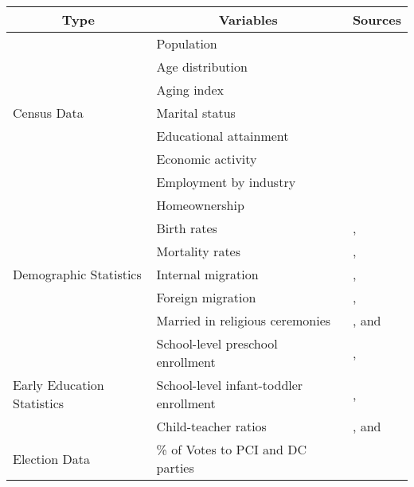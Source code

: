 \begin{tabular}{lll}
\toprule
\multicolumn{1}{c}{Type}	&	\multicolumn{1}{c}{Variables}	&	\multicolumn{1}{c}{Sources}	\\
\midrule
			&	Population & \\
			& 	Age distribution & \\
			&	Aging index & \\
Census Data	&	Marital status & \citet{Istat_2014_Atlante-Statistico} \\
			& 	Educational attainment & \citet{Istat_2016_Pop-House} \\
			& 	Economic activity & \\
			& 	Employment by industry & \\
			& 	Homeownership	&	\\
\midrule
						&		Birth rates 			&	\citet{Reggio-Emilia_2016_Population-Stats}, \\
						&	Mortality rates		& 	\citet{Padova-Admin-Data_1964-2010}, 	\\
	Demographic Statistics	&	 Internal migration 		&	\citet{Statistica-Regionae_2016_Veneto}, \\
						&	Foreign migration 	&  	\citet{Emilia-Romagna_2016_Population},\\
						&	Married in religious ceremonies		& \citet{Parma_2016_demografico-1958}, and \citet{Istat_2016_Geo-Demo} \\
\midrule
						&	School-level preschool enrollment	 &	\citet{Reggio-Emilia_2011_Preschool-Enroll}, \\
	Early Education Statistics	& 	School-level infant-toddler enrollment & 	\citet{Padova-Admin-Data_1964-2010},  \\
						& 	Child-teacher ratios				& \citet{Istat_2014_Atlante-Statistico}, and \citet{Reggio-Emilia-Admin-Data_1966-2010} \\
\midrule
Election Data				&	\% of Votes to PCI and DC parties 	&	\citet{Archivo-Storico_2016} \\
\bottomrule
\end{tabular}

